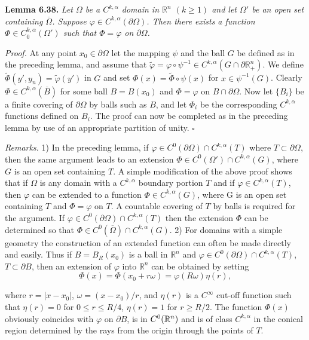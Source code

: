 \textbf{Lemma 6.38.} \textit{Let $\Omega$ be a $C^{k,\alpha}$ domain in $\mathbb{R}^n$ $(k\ge 1)$ and let $\Omega'$ be an open set containing
$\overline{\Omega}$. Suppose $\varphi\in C^{k,\alpha}(\partial\Omega)$. Then there exists a function $\Phi\in C_0^{k,\alpha}(\Omega')$ such that
$\Phi=\varphi$ on $\partial\Omega$.}

\textit{Proof.} At any point $x_0\in\partial\Omega$ let the mapping $\psi$ and the ball $G$ be defined as in the
preceding lemma, and assume that $\tilde\varphi=\varphi\circ\psi^{-1}\in C^{k,\alpha}(G\cap\partial\mathbb{R}^n_+)$. We define
$\tilde\Phi(y',y_n)=\tilde\varphi(y')$ in $G$ and set $\Phi(x)=\tilde\Phi\circ\psi(x)$ for $x\in\psi^{-1}(G)$. Clearly $\Phi\in C^{k,\alpha}(\overline{B})$
for some ball $B=B(x_0)$ and $\Phi=\varphi$ on $B\cap\partial\Omega$. Now let $\{B_i\}$ be a finite covering of
$\partial\Omega$ by balls such as $B$, and let $\Phi_i$ be the corresponding $C^{k,\alpha}$ functions defined on $B_i$.
The proof can now be completed as in the preceding lemma by use of an appropriate
partition of unity. $\square$

\textit{Remarks.} 1) In the preceding lemma, if $\varphi\in C^0(\partial\Omega)\cap C^{k,\alpha}(T)$ where $T\subset\partial\Omega$,
then the same argument leads to an extension $\Phi\in C^0(\Omega')\cap C^{k,\alpha}(G)$, where $G$ is an
open set containing $T$. A simple modification of the above proof shows that if $\Omega$
is any domain with a $C^{k,\alpha}$ boundary portion $T$ and if $\varphi\in C^{k,\alpha}(T)$, then $\varphi$ can be
extended to a function $\Phi\in C^{k,\alpha}(G)$, where G is an open set containing $T$ and $\Phi=\varphi$
on $T$. A countable covering of $T$ by balls is required for the argument.
If $\varphi\in C^0(\partial\Omega)\cap C^{k,\alpha}(T)$ then the extension $\Phi$ can be determined so that
$\Phi\in C^0(\overline{\Omega})\cap C^{k,\alpha}(G)$. 2) For domains with a simple geometry the construction
of an extended function can often be made directly and easily. Thus if $B=B_R(x_0)$
is a ball in $\mathbb{R}^n$ and $\varphi\in C^0(\partial\Omega)\cap C^{k,\alpha}(T)$, $T\subset\partial B$, then an extension of $\varphi$ into
$\mathbb{R}^n$ can be obtained by setting
\[
  \Phi(x)=\Phi(x_0+r\omega)=\varphi(R\omega)\eta(r),
\]


where $r = |x-x_0|$, $\omega = (x-x_0)/r$, and $\eta(r)$ is a $C^\infty$ cut-off function such that $\eta(r)=0$ for $0 \le r \le R/4$, $\eta(r)=1$ for $r \ge R/2$. The function $\Phi(x)$ obviously coincides with $\varphi$ on $\partial B$, is in $C^0(\mathbb{R}^n)$ and is of class $C^{k,\alpha}$ in the conical region determined by the rays from the origin through the points of $T$.

